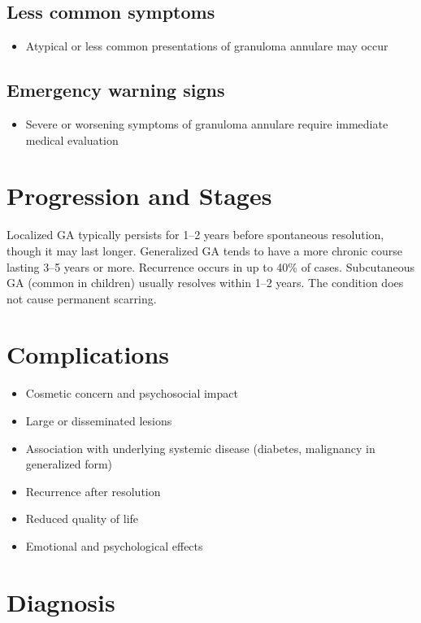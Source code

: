 \subsection{Less common symptoms}
\begin{itemize}[noitemsep]
  \item Atypical or less common presentations of granuloma annulare may occur
\end{itemize}

\subsection{Emergency warning signs}
\begin{itemize}[noitemsep]
  \item Severe or worsening symptoms of granuloma annulare require immediate medical evaluation
\end{itemize}
\section{Progression and Stages}
Localized GA typically persists for 1--2 years before spontaneous resolution, though it may last longer. Generalized GA tends to have a more chronic course lasting 3--5 years or more. Recurrence occurs in up to 40\% of cases. Subcutaneous GA (common in children) usually resolves within 1--2 years. The condition does not cause permanent scarring.

\section{Complications}

\begin{itemize}[noitemsep]
  \item Cosmetic concern and psychosocial impact
  \item Large or disseminated lesions
  \item Association with underlying systemic disease (diabetes, malignancy in generalized form)
  \item Recurrence after resolution
  \item Reduced quality of life
  \item Emotional and psychological effects
\end{itemize}

\section{Diagnosis}

